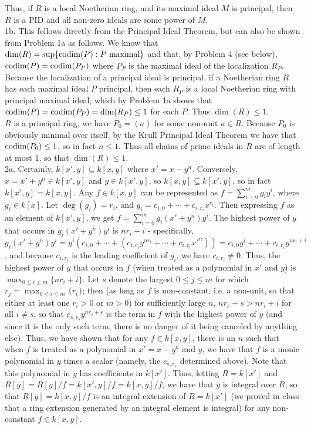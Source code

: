 \documentclass[11pt]{article}
\begin{document}
Thus, if $R$ is a local Noetherian ring, and its maximal ideal $M$ is
principal, then $R$ is a PID and all non-zero ideals are some power of $M$.\\

\num{1b.} This follows directly from the Principal Ideal Theorem,
but can also be shown from Problem 1a as follows. We know that
$\operatorname{dim}(R)=\sup\{\operatorname{codim}(P):P\text{ maximal}\}$ and that, by Problem 4
(see below), $\operatorname{codim}(P)=\operatorname{codim}(P_P)$ where $P_P$ is the maximal ideal of
the localization $R_P$. Because the localization of a principal ideal is
principal, if a Noetherian ring $R$ has each maximal ideal $P$ principal,
then each $R_P$ is a local Noetherian ring with principal maximal ideal,
which by Problem 1a shows that $\operatorname{codim}(P)=\operatorname{codim}(P_P)=\operatorname{dim}(R_P)\leq1$ for
each $P$. Thus $\dim(R)\leq 1$.    \\

$R$ is a principal ring, we have $P_0=(a)$ for some non-unit $a\in R$. Because
$P_0$ is obviously minimal over itself, by the Krull Principal Ideal Theorem
we have that $\operatorname{codim}(P_0)\leq 1$, so in fact $n\leq 1$. Thus all chains of
prime ideals in $R$ are of length at most 1, so that $\dim(R)\leq 1$. \\

\num{2a.} Certainly, $k[x',y]\subseteq k[x,y]$ where $x'=x-y^n$. Conversely,
$x=x'+y^n\in k[x',y]$ and $y\in k[x',y]$, so $k[x,y]\subseteq k[x',y]$,
so in fact $k[x',y]=k[x,y]$. Any $f\in k[x,y]$ can be represented as
$f=\sum_{i=0}^m g_iy^i$, where $g_i\in k[x]$. Let $\deg(g_i)=r_i$,
and $g_i=c_{i,0}+\cdots+c_{i,r_i}x^{r_i}$. Then expressing $f$ as an
element of $k[x',y]$, we get $f=\sum_{i=0}^m g_i(x'+y^n)y^i$. The highest
power of $y$ that occurs in $g_i(x'+y^n)y^i$ is $nr_i+i$ - specifically,
$g_i(x'+y^n)y^i=y^i(c_{i,0}+\cdots+(c_{i,r_i}y^{nr_i}+\cdots+c_{i,r_i}x'^n))=c_{i,0}y^i+\cdots+c_{i,r_i}y^{nr_i+i}$,
and because $c_{i,r_i}$ is the leading coefficient of $g_i$, we have
$c_{i,r_i}\neq0$. Thus, the highest power of $y$ that occurs in $f$
(when treated as a polynomial in $x'$ and $y$) is $\max_{0\leq i\leq
m}\{nr_i+i\}$. Let $s$ denote the largest $0\leq j\leq m$ for which
$r_j=\max_{0\leq i\leq m}\{r_i\}$; then (as long as $f$ is non-constant,
i.e. a non-unit, so that either at least one $r_i>0$ or $m>0$) for sufficiently
large $n$, $nr_s+s>nr_i+i$ for all $i\neq s$, so that $c_{s,r_s}y^{nr_s+s}$
is the term in $f$ with the highest power of $y$ (and since it is the only
such term, there is no danger of it being canceled by anything else). Thus,
we have shown that for any $f\in k[x,y]$, there is an $n$ such that when
$f$ is treated as a polynomial in $x'=x-y^n$ and $y$, we have that $f$ is a
monic polynomial in $y$ times a scalar (namely, the $c_{s,r_s}$ determined
above). Note that this polynomial in $y$ has coefficients in $k[x']$. Thus,
letting $R=k[x']$ and $R[\bar{y}]=R[y]/f=k[x',y]/f=k[x,y]/f$, we have that
$\bar{y}$ is integral over $R$, so that $R[\bar{y}]=k[x,y]/f$ is an integral
extension of $R=k[x']$ (we proved in class that a ring extension generated
by an integral element is integral) for any non-constant $f\in k[x,y]$. \\
\end{document}
